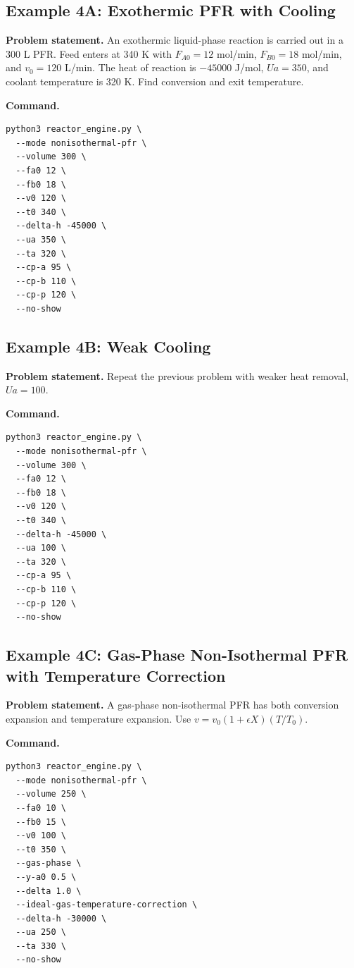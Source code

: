 \documentclass[11pt]{article}
\begin{document}
\subsection{Example 4A: Exothermic PFR with Cooling}

\textbf{Problem statement.} An exothermic liquid-phase reaction is carried out in a 300 L PFR. Feed enters at 340 K with $F_{A0}=12$ mol/min, $F_{B0}=18$ mol/min, and $v_0=120$ L/min. The heat of reaction is $-45000$ J/mol, $Ua=350$, and coolant temperature is 320 K. Find conversion and exit temperature.

\textbf{Command.}

\begin{lstlisting}
python3 reactor_engine.py \
  --mode nonisothermal-pfr \
  --volume 300 \
  --fa0 12 \
  --fb0 18 \
  --v0 120 \
  --t0 340 \
  --delta-h -45000 \
  --ua 350 \
  --ta 320 \
  --cp-a 95 \
  --cp-b 110 \
  --cp-p 120 \
  --no-show
\end{lstlisting}

\subsection{Example 4B: Weak Cooling}

\textbf{Problem statement.} Repeat the previous problem with weaker heat removal, $Ua=100$.

\textbf{Command.}

\begin{lstlisting}
python3 reactor_engine.py \
  --mode nonisothermal-pfr \
  --volume 300 \
  --fa0 12 \
  --fb0 18 \
  --v0 120 \
  --t0 340 \
  --delta-h -45000 \
  --ua 100 \
  --ta 320 \
  --cp-a 95 \
  --cp-b 110 \
  --cp-p 120 \
  --no-show
\end{lstlisting}

\subsection{Example 4C: Gas-Phase Non-Isothermal PFR with Temperature Correction}

\textbf{Problem statement.} A gas-phase non-isothermal PFR has both conversion expansion and temperature expansion. Use $v=v_0(1+\epsilon X)(T/T_0)$.

\textbf{Command.}

\begin{lstlisting}
python3 reactor_engine.py \
  --mode nonisothermal-pfr \
  --volume 250 \
  --fa0 10 \
  --fb0 15 \
  --v0 100 \
  --t0 350 \
  --gas-phase \
  --y-a0 0.5 \
  --delta 1.0 \
  --ideal-gas-temperature-correction \
  --delta-h -30000 \
  --ua 250 \
  --ta 330 \
  --no-show
\end{lstlisting}
\end{document}
